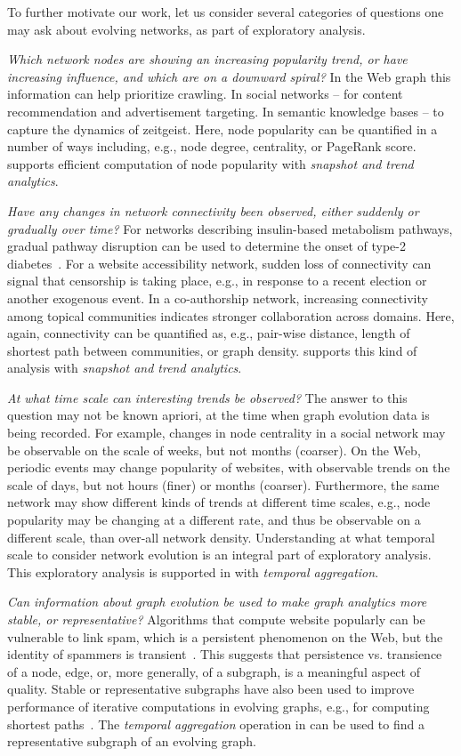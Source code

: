 To further motivate our work, let us consider several categories of
questions one may ask about evolving networks, as part of exploratory
analysis.

{\em Which network nodes are showing an increasing popularity trend,
  or have increasing influence, and which are on a downward spiral?}
In the Web graph this information can help prioritize crawling.  In
social networks -- for content recommendation and advertisement
targeting.  In semantic knowledge bases -- to capture the dynamics of
zeitgeist.  Here, node popularity can be quantified in a number of
ways including, e.g., node degree, centrality, or PageRank score.  \ql
supports efficient computation of node popularity with {\em snapshot
  and trend analytics}.

{\em Have any changes in network connectivity been observed, either
  suddenly or gradually over time?}  For networks describing
insulin-based metabolism pathways, gradual pathway disruption can be
used to determine the onset of type-2
diabetes~\cite{DBLP:journals/tcsb/BeyerTLSF10}.  For a website
accessibility network, sudden loss of connectivity can signal that
censorship is taking place, e.g., in response to a recent election or
another exogenous event.  In a co-authorship network, increasing
connectivity among topical communities indicates stronger
collaboration across domains.  Here, again, connectivity can be
quantified as, e.g., pair-wise distance, length of shortest path
between communities, or graph density.  \ql supports this kind of
analysis with {\em snapshot and trend analytics}.

{\em At what time scale can interesting trends be observed?} The
answer to this question may not be known apriori, at the time when
graph evolution data is being recorded.  For example, changes in node
centrality in a social network may be observable on the scale of
weeks, but not months (coarser).  On the Web, periodic events may
change popularity of websites, with observable trends on the scale of
days, but not hours (finer) or months (coarser).  Furthermore, the
same network may show different kinds of trends at different time
scales, e.g., node popularity may be changing at a different rate, and
thus be observable on a different scale, than over-all network
density.  Understanding at what temporal scale to consider network
evolution is an integral part of exploratory analysis.  This
exploratory analysis is supported in \ql with {\em temporal
  aggregation}.

{\em Can information about graph evolution be used to make graph
  analytics more stable, or representative?}  Algorithms that compute
website popularly can be vulnerable to link spam, which is a
persistent phenomenon on the Web, but the identity of spammers is
transient~\cite{DBLP:conf/cikm/YangQZGL07}.  This suggests that
persistence vs. transience of a node, edge, or, more generally, of a
subgraph, is a meaningful aspect of quality.  Stable or representative
subgraphs have also been used to improve performance of iterative
computations in evolving graphs, e.g., for computing shortest
paths~\cite{Ren2011}.  The {\em temporal aggregation} operation in \ql
can be used to find a representative subgraph of an evolving graph.

